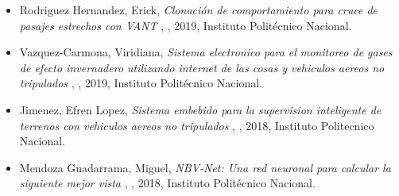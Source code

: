\begin{itemize} 
\item Rodriguez Hernandez, Erick, \textit{ Clonaci\'on de comportamiento para cruce de pasajes estrechos con VANT }, \href{ https://jivasquez.files.wordpress.com/2019/08/tesiserhempastar.pdf }{\faFilePdfO}, 2019, Instituto Polit\'ecnico Nacional. 
\item Vazquez-Carmona, Viridiana, \textit{ Sistema electronico para el monitoreo de gases de efecto invernadero utilizando internet de las cosas y vehiculos aereos no tripulados }, \href{ https://jivasquez.files.wordpress.com/2020/09/2019_maestria_vazquez.pdf }{\faFilePdfO}, 2019, Instituto Polit\'ecnico Nacional. 
\item Jimenez, Efren Lopez, \textit{ Sistema embebido para la supervision inteligente de terrenos con vehiculos aereos no tripulados }, \href{ https://jivasquez.files.wordpress.com/2018/12/master_thesis_2018_lopez.pdf }{\faFilePdfO}, 2018, Instituto Politecnico Nacional. 
\item Mendoza Guadarrama, Miguel, \textit{ NBV-Net: Una red neuronal para calcular la siguiente mejor vista }, \href{ https://jivasquez.files.wordpress.com/2018/12/2018_maestria_Mendoza.pdf }{\faFilePdfO}, 2018, Instituto Politécnico Nacional. 
\end{itemize} 
